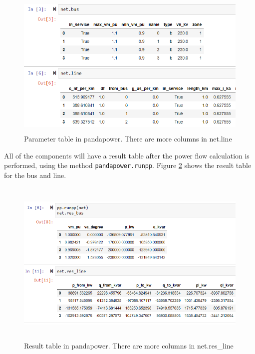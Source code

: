 \documentclass[class=book, crop=false]{standalone}
\begin{document}
\begin{figure}[H]
    \includegraphics[height=7cm, width=13.5cm]{figures/case4g_line_bus.PNG}
    \caption[size = 9]{Parameter table in pandapower. There are more columns in net.line}
    \label{fig:method:line_bus_dataframe}
\end{figure}
All of the components will have a result table after the power flow calculation is performed, using the method \texttt{pandapower.runpp}. Figure \ref{fig:method:res_line_bus_dataframe} shows the result table for the bus and line.

\begin{figure}[H]
    \includegraphics[height=8cm, width=14cm]{figures/case4g_line_bus_res.PNG}
    \caption[size = 9]{Result table in pandapower. There are more columns in net.res\_line}
    \label{fig:method:res_line_bus_dataframe}
\end{figure}
\end{document}
